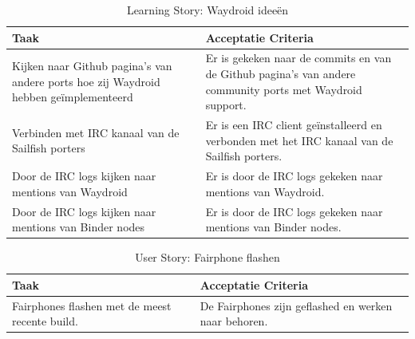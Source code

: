 \documentclass[a4paper]{report}
\newcommand{\learningstorycolor}{PaleGreen1}
\newcommand{\userstorycolor}{PeachPuff1}
\begin{document}
  \begin{tcolorbox}[colback=white, coltitle=black, colframe=\learningstorycolor, title=\textbf{Learning Story: }Als developer wil ik weten wat voor problemen zouden kunnen zorgen dat Waydroid de binder nodes niet kan vinden\, zodat ik kan verder kan nadenken over potentiële oplossingen.]
    \begin{table}[H]
        \centering
      \begin{tabularx}{1\textwidth}{|X|X|}
        \hline
        \cellcolor[HTML]{ffcc99} \textbf{Taak} & \cellcolor[HTML]{ffcc99} \textbf{Acceptatie Criteria} \\ 
        \hline 
        Kijken naar Github pagina's van andere ports hoe zij Waydroid hebben geïmplementeerd & Er is gekeken naar de commits en van de Github pagina's van andere community ports met Waydroid support. \\
        \hline
        Verbinden met IRC kanaal van de Sailfish porters & Er is een IRC client geïnstalleerd en verbonden met het IRC kanaal van de Sailfish porters. \\
        \hline
        Door de IRC logs kijken naar mentions van Waydroid & Er is door de IRC logs gekeken naar mentions van Waydroid. \\
        \hline
        Door de IRC logs kijken naar mentions van Binder nodes & Er is door de IRC logs gekeken naar mentions van Binder nodes. \\
        \hline
      \end{tabularx}
      \caption{Learning Story: Waydroid ideeën}
    \label{table:it7:story_waydroid_ideas}
    \end{table}
    \end{tcolorbox}

  \begin{tcolorbox}[colback=white, coltitle=black, colframe=\userstorycolor, title=\textbf{User Story: }Als developer wil ik dat er een Fairphone geflashed is met de recenste build\, zodat er dingen getest kunnen worden op de telefoon.]
    \begin{table}[H]
        \centering
      \begin{tabularx}{1\textwidth}{|X|X|}
        \hline
        \cellcolor[HTML]{ffcc99} \textbf{Taak} & \cellcolor[HTML]{ffcc99} \textbf{Acceptatie Criteria} \\ 
        \hline
        Fairphones flashen met de meest recente build. & De Fairphones zijn geflashed en werken naar behoren. \\
        \hline
      \end{tabularx}
      \caption{User Story: Fairphone flashen}
    \label{table:it7:story_flashing}
    \end{table}
    \end{tcolorbox}
\end{document}
